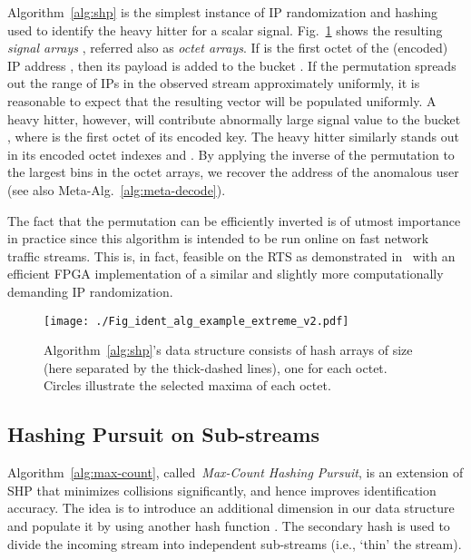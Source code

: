 \documentclass[10pt, conference, letterpaper,onecolumn]{IEEEtranv1.8}
\theoremstyle{plain}\newtheorem{thm}{Theorem}\newtheorem{lem}{Lemma}
\theoremstyle{definition}
\begin{document}
Algorithm~\ref{alg:shp} is the simplest instance of IP randomization and hashing used to identify the
heavy hitter for a scalar signal.  Fig.~\ref{fig:ident_typical} shows the resulting {\em signal arrays} 
, referred also as \emph{octet arrays}. If  is the first octet of 
the (encoded) IP address , then its payload  is added to the bucket .
If the permutation  spreads out the range of IPs in the observed stream approximately uniformly,
 it is reasonable to expect that the resulting vector  
will be populated uniformly.  A heavy hitter, however, will contribute abnormally large signal value to the bucket
, where   is the first octet of its encoded key. The heavy hitter similarly stands out in its encoded octet indexes  and . By applying the inverse of the permutation  to the largest bins 
in the octet arrays, we recover the address of the anomalous user (see also Meta-Alg.\ \ref{alg:meta-decode}). 

The fact that the permutation  can be efficiently inverted is of utmost importance in practice 
since this algorithm is intended to be run online on fast network traffic streams. This is, in fact, feasible on the RTS
as demonstrated in~\cite{4146856} with an efficient FPGA implementation of a similar and slightly more 
computationally demanding IP randomization.

 
 


\begin{figure}
        \centering
        \texttt{[image: ./Fig\_ident\_alg\_example\_extreme\_v2.pdf]}
        \caption{Algorithm~\ref{alg:shp}'s data structure consists of  hash arrays of size  (here separated by the thick-dashed lines), one for each octet. Circles illustrate the selected maxima of each octet.}
        \label{fig:ident_typical}
\end{figure}

\subsection{Hashing Pursuit on Sub-streams}
\label{sec:max_count}

Algorithm~\ref{alg:max-count}, called~\emph{Max-Count Hashing Pursuit}, is an extension of SHP that minimizes collisions significantly, 
and hence improves identification accuracy. The idea is to introduce an
additional dimension  in our data structure and populate it by using another hash function . The secondary
hash is used to divide the incoming stream into  independent sub-streams (i.e., `thin' the stream). 
\end{document}
